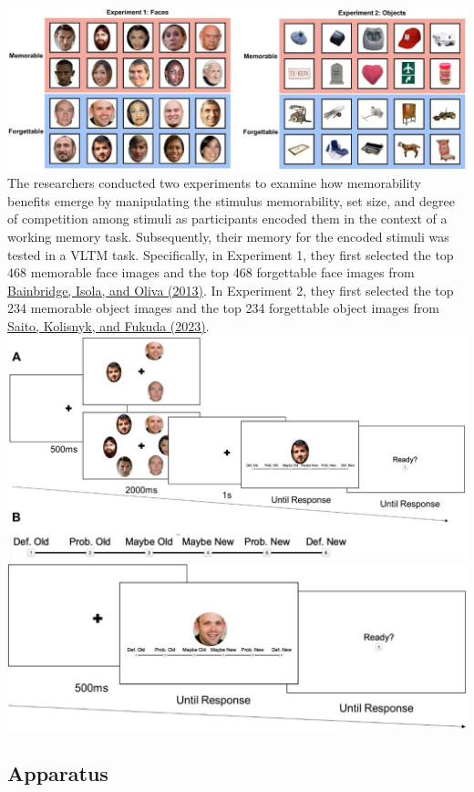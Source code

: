 \documentclass[
  man]{apa6}
\begin{document}
\includegraphics{stim.jpg}
The researchers conducted two experiments to examine how memorability benefits emerge by manipulating the stimulus memorability, set size, and degree of competition among stimuli as participants encoded them in the context of a working memory task. Subsequently, their memory for the encoded stimuli was tested in a VLTM task.
Specifically, in Experiment 1, they first selected the top 468 memorable face images and the top 468 forgettable face images from \href{see\%20Fig.\%201}{Bainbridge, Isola, and Oliva (2013)}.
In Experiment 2, they first selected the top 234 memorable object images and the top 234 forgettable object images from \href{see\%20Fig.\%201}{Saito, Kolisnyk, and Fukuda (2023)}.
\includegraphics{vwm_task.jpg}
\includegraphics{VLTM_task.jpg}

\hypertarget{apparatus}{%
\subsection{Apparatus}\label{apparatus}}
\end{document}
